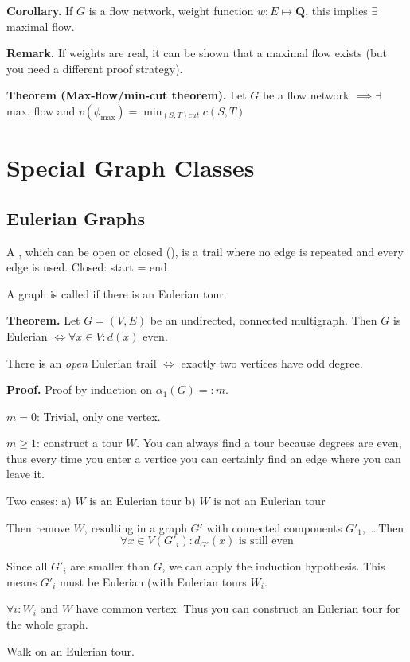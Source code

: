 \textbf{Corollary.} If $G$ is a flow network, weight function $w: E\mapsto \mathbf{Q}$, this implies $\exists$ maximal flow.

\textbf{Remark.}
If weights are real, it can be shown that a maximal flow exists (but you need a different proof strategy).

\textbf{Theorem (Max-flow/min-cut theorem).}
Let $G$ be a flow network $\implies \exists$ max. flow and $v(\phi_{\text{max}})= \min_{(S,T) cut} c(S,T)$



\section{Special Graph Classes}

\subsection{Eulerian Graphs}

\begin{definition}
A , which can be open or closed (), is a trail where no edge is repeated and every edge is used. Closed: start = end
\end{definition}

\begin{definition}
A graph is called  if there is an Eulerian tour.
\end{definition}

\textbf{Theorem.}
Let $G=(V,E)$ be an undirected, connected multigraph. Then $G$ is Eulerian $\iff \forall x\in V: d(x)\text{ even}$.

There is an \emph{open} Eulerian trail $\iff$ exactly two vertices have odd degree.

\textbf{Proof.}
Proof by induction on $\alpha_1(G) =: m$.

$m = 0$: Trivial, only one vertex.

$m ≥ 1$: construct a tour $W$. You can always find a tour because degrees are even, thus every time you enter a vertice you can certainly find an edge where you can leave it.

Two cases:
a) $W$ is an Eulerian tour
b) $W$ is not an Eulerian tour

Then remove $W$, resulting in a graph $G'$ with connected components $G'_1$,~\ldots Then
\[
    \forall x\in V(G'_{i}): d_{G'}(x)\text{ is still even}
\]

Since all $G'_{i}$ are smaller than $G$, we can apply the induction hypothesis. This means $G'_{i}$ must be Eulerian (with Eulerian tours $W_{i}$.

$\forall i: W_i$ and $W$ have common vertex. Thus you can construct an Eulerian tour for the whole graph.



Walk on an Eulerian tour. 











